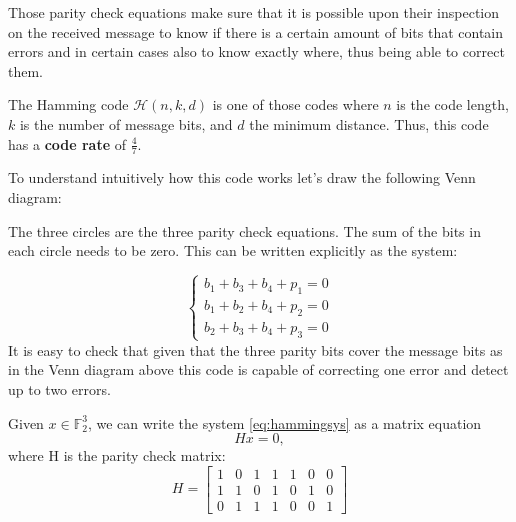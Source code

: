 Those parity check equations make sure that it is possible upon their inspection on the received message to know if there is a certain amount of bits that contain errors and in certain cases also to know exactly where, thus being able to correct them.

The Hamming code $\mathcal{H}(n, k, d)$ is one of those codes where $n$ is the code length, $k$ is the number of message bits, and $d$ the minimum distance.
Thus, this code has a \textbf{code rate} of $\frac{4}{7}$.

To understand intuitively how this code works let's draw the following Venn diagram:
\def\firstcircle{(90:1.75cm) circle (2.5cm)}
\def\secondcircle{(210:1.75cm) circle (2.5cm)}
\def\thirdcircle{(330:1.75cm) circle (2.5cm)}
\begin{center}
\end{center}

The three circles are the three parity check equations. The sum of the bits in each circle needs to be zero. This can be written explicitly as the system:

\begin{equation}
	\begin{cases}
		b_1 + b_3 + b_4 +p_1 = 0 \\
		b_1 + b_2 + b_4 +p_2 = 0 \\
		b_2 + b_3 + b_4 +p_3 = 0
	\end{cases}
	\label{eq:hammingsys}
\end{equation}
It is easy to check that given that the three parity bits cover the message bits as in the Venn diagram above this code is capable of correcting one error and detect up to two errors.

Given $x \in \mathbb{F}^3_2 $, we can write the system \ref{eq:hammingsys} as a matrix equation
\begin{equation}
Hx = 0,
\end{equation}
where H is the parity check matrix:
\begin{equation}
H = \left[\begin{matrix}
1 & 0 & 1 & 1 & 1 & 0 & 0 \\
1 & 1 & 0 & 1 & 0 & 1 & 0 \\
0 & 1 & 1 & 1 & 0 & 0 & 1
\end{matrix} \right]
\end{equation}

